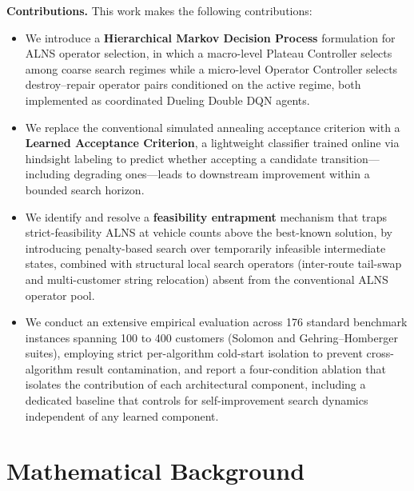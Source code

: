 \documentclass[journal]{IEEEtran}
\begin{document}
\textbf{Contributions.} This work makes the following contributions:
\begin{itemize}[leftmargin=1.2em,topsep=2pt]
  \item We introduce a \textbf{Hierarchical Markov Decision Process} formulation for ALNS operator selection, in which a macro-level Plateau Controller selects among coarse search regimes while a micro-level Operator Controller selects destroy--repair operator pairs conditioned on the active regime, both implemented as coordinated Dueling Double DQN agents.
  \item We replace the conventional simulated annealing acceptance criterion with a \textbf{Learned Acceptance Criterion}, a lightweight classifier trained online via hindsight labeling to predict whether accepting a candidate transition---including degrading ones---leads to downstream improvement within a bounded search horizon.
  \item We identify and resolve a \textbf{feasibility entrapment} mechanism that traps strict-feasibility ALNS at vehicle counts above the best-known solution, by introducing penalty-based search over temporarily infeasible intermediate states, combined with structural local search operators (inter-route tail-swap and multi-customer string relocation) absent from the conventional ALNS operator pool.
  \item We conduct an extensive empirical evaluation across 176 standard benchmark instances spanning 100 to 400 customers (Solomon and Gehring--Homberger suites), employing strict per-algorithm cold-start isolation to prevent cross-algorithm result contamination, and report a four-condition ablation that isolates the contribution of each architectural component, including a dedicated baseline that controls for self-improvement search dynamics independent of any learned component.
\end{itemize}










\section{Mathematical Background}
\label{sec:background}
\end{document}
